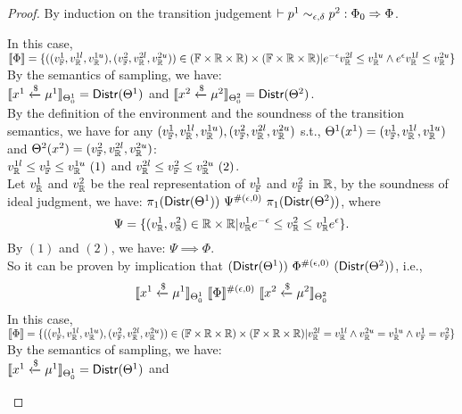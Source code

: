\documentclass[a4paper,11pt]{article}
\begin{document}
\begin{proof}
By induction on the transition judgement $\vdash p^1	
\sim_{\epsilon, \delta} 
p^2 :
\Phi_0 \Rightarrow \Phi $.
\begin{itemize}
	In this case, 
	$\llbracket \Phi \rrbracket = 
	\{((v_{\mathbb{F}}^1, v_{\mathbb{R}}^{1l}, v_{\mathbb{R}}^{1u}), (v_{\mathbb{F}}^2, v_{\mathbb{R}}^{2l}, v_{\mathbb{R}}^{2u})) 
	\in (\mathbb{F} \times \mathbb{R} \times \mathbb{R}) \times (\mathbb{F} \times \mathbb{R} \times \mathbb{R})
	|
	e^{-\epsilon} v_{\mathbb{R}}^{2l} \leq v_{\mathbb{R}}^{1u}
	\land
	e^{\epsilon} v_{\mathbb{R}}^{1l} \leq v_{\mathbb{R}}^{2u}
	\}$
	\\
	By the semantics of sampling, we have:\\
	$\llbracket x^1 \xleftarrow{\$} \mu^1 \rrbracket_{\Theta^1_0} = \mathsf{Distr}(\Theta^1)$ and 
	$\llbracket x^2 \xleftarrow{\$} \mu^2 \rrbracket_{\Theta^2_0} = \mathsf{Distr}(\Theta^2)$. \\
	By the definition of the environment and the soundness of the transition semantics, we have for any $(v_{\mathbb{F}}^1, v_{\mathbb{R}}^{1l}, v_{\mathbb{R}}^{1u}), (v_{\mathbb{F}}^2, v_{\mathbb{R}}^{2l}, v_{\mathbb{R}}^{2u})$ s.t.,
	$\Theta^1 (x^1) = (v_{\mathbb{F}}^1, v_{\mathbb{R}}^{1l}, v_{\mathbb{R}}^{1u})$
	and
	$\Theta^2 (x^2) = (v_{\mathbb{F}}^2, v_{\mathbb{R}}^{2l}, v_{\mathbb{R}}^{2u})$:
	\\
	$ v_{\mathbb{R}}^{1l} \leq v_{\mathbb{F}}^1 \leq v_{\mathbb{R}}^{1u} ~ (1)$ 
	and
	$ v_{\mathbb{R}}^{2l} \leq v_{\mathbb{F}}^2 \leq v_{\mathbb{R}}^{2u} ~ (2)$.
	\\
	Let $v_{\mathbb{R}}^1$ and $v_{\mathbb{R}}^2$ be the real representation of $v_{\mathbb{F}}^1$ and $v_{\mathbb{F}}^2$ in $\mathbb{R}$, by the soundness of ideal judgment, we have:
	$\pi_1 (\mathsf{Distr}(\Theta^1)) ~ \Psi^{\#(\epsilon, 0)} ~ \pi_1 (\mathsf{Distr}(\Theta^2))$, where
	\[
		\Psi = \{(v_{\mathbb{R}}^1, v_{\mathbb{R}}^2) \in \mathbb{R} \times \mathbb{R}
		| 
		v_{\mathbb{R}}^1 e^{-\epsilon} 
		\leq v_{\mathbb{R}}^2
		\leq v_{\mathbb{R}}^1 e^{\epsilon} \}.
	\]
	By $(1)$ and $(2)$, we have:
	$\Psi \implies \Phi$.
	\\
	So it can be proven by implication that 
	$(\mathsf{Distr}(\Theta^1)) ~ \Phi^{\#(\epsilon, 0)} ~ (\mathsf{Distr}(\Theta^2))$, i.e., 
	$$
	\llbracket x^1 \xleftarrow{\$} \mu^1 \rrbracket_{\Theta^1_0} 
		~ \llbracket \Phi \rrbracket^{\#(\epsilon, 0)} ~
		\llbracket x^2 \xleftarrow{\$} \mu^2 \rrbracket_{\Theta^2_0}
	$$
	In this case, 
	$\llbracket \Phi \rrbracket = 
	\{((v_{\mathbb{F}}^1, v_{\mathbb{R}}^{1l}, v_{\mathbb{R}}^{1u}), (v_{\mathbb{F}}^2, v_{\mathbb{R}}^{2l}, v_{\mathbb{R}}^{2u})) 
	\in (\mathbb{F} \times \mathbb{R} \times \mathbb{R}) \times (\mathbb{F} \times \mathbb{R} \times \mathbb{R})
	|
	v_{\mathbb{R}}^{2l} = v_{\mathbb{R}}^{1l}
	\land
	v_{\mathbb{R}}^{2u} = v_{\mathbb{R}}^{1u}
	\land
	v_{\mathbb{F}}^1 = v_{\mathbb{F}}^2
	\}$
	\\
	By the semantics of sampling, we have:\\
	$\llbracket x^1 \xleftarrow{\$} \mu^1 \rrbracket_{\Theta^1_0} = \mathsf{Distr}(\Theta^1)$ and 

\end{itemize}
\end{proof}
\end{document}

